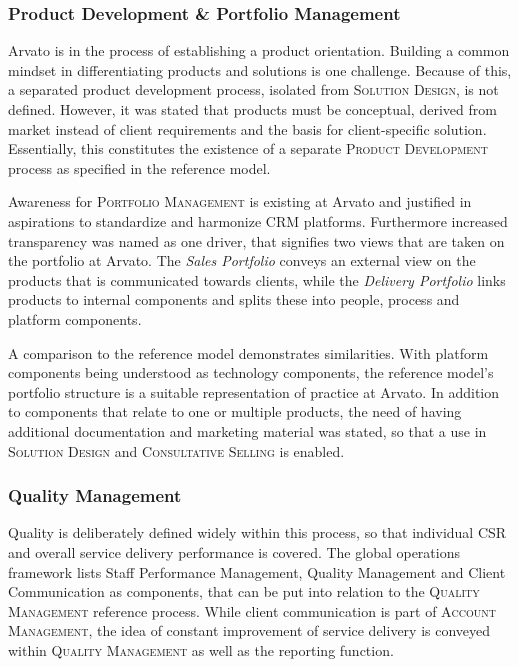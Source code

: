 	\subsubsection{Product Development \& Portfolio Management}
	
	Arvato is in the process of establishing a product orientation. Building a common mindset in differentiating products and solutions is one challenge. Because of this, a separated product development process, isolated from \textsc{Solution Design}, is not defined. However, it was stated that products must be conceptual, derived from market instead of client requirements and the basis for client-specific solution. Essentially, this constitutes the existence of a separate \textsc{Product Development} process as specified in the reference model. 
	
	Awareness for \textsc{Portfolio Management} is existing at Arvato and justified in aspirations to standardize and harmonize \acrshort{CRM} platforms. Furthermore increased transparency was named as one driver, that signifies two views that are taken on the portfolio at Arvato. The \textit{Sales Portfolio} conveys an external view on the products that is communicated towards clients, while the \textit{Delivery Portfolio} links products to internal components and splits these into people, process and platform components. 
	
	A comparison to the reference model demonstrates similarities. With platform components being understood as technology components, the reference model's portfolio structure is a suitable representation of practice at Arvato. 
	In addition to components that relate to one or multiple products, the need of having additional documentation and marketing material was stated, so that a use in \textsc{Solution Design} and \textsc{Consultative Selling} is enabled. 
	
	\subsubsection{Quality Management}
	Quality is deliberately defined widely within this process, so that individual \acrshort{CSR} and overall service delivery performance is covered. The global operations framework lists Staff Performance Management, Quality Management and Client Communication as components, that can be put into relation to the \textsc{Quality Management} reference process. While client communication is part of \textsc{Account Management}, the idea of constant improvement of service delivery is conveyed within \textsc{Quality Management} as well as the reporting function. 
	

